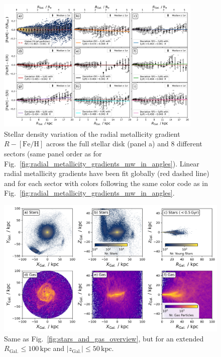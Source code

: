 \documentclass[twocolumn,apj,numberedappendix,appendixfloats]{openjournal}
\begin{document}
\begin{figure}
    \centering
    \includegraphics[width=0.875\textwidth]{figures/linear_radial_metallicity_gradients_mw_in_angles.png}
    \caption{Stellar density variation of the radial metallicity gradient $R-\mathrm{[Fe/H]}$ across the full stellar disk (panel a) and 8 different sectors (same panel order as for Fig.~\ref{fig:radial_metallicity_gradients_mw_in_angles}). Linear radial metallicity gradients have been fit globally (red dashed line) and for each sector with colors following the same color code as in Fig.~\ref{fig:radial_metallicity_gradients_mw_in_angles}.}    \label{fig:linear_radial_metallicity_gradients_mw_in_angles}
\end{figure}

\begin{figure}
    \centering
    \includegraphics[width=\textwidth]{figures/stars_and_gas_overview_100kpc.png}
    \caption{Same as Fig.~\ref{fig:stars_and_gas_overview}, but for an extended $R_\mathrm{Gal.} \leq 100\,\mathrm{kpc}$ and $\vert z_\mathrm{Gal.} \vert \leq 50\,\mathrm{kpc}$.}
    \label{fig:stars_and_gas_overview_100kpc}
\end{figure}

\end{document}
